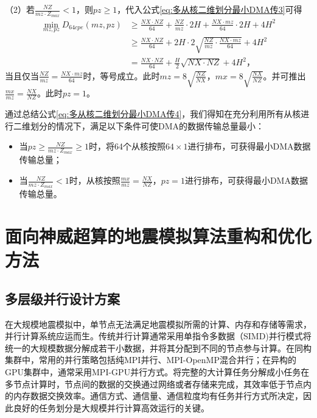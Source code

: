\documentclass[degree=doctor]{thuthesis}
\begin{document}
（2）若$\frac{NZ}{mz\cdot Z_{max}} < 1$，则$pz\ge 1$，代入公式\ref{eq:多从核二维划分最小DMA传3}可得
\begin{equation}
\begin{aligned}
  \min_{mz,pz} D_{64cpe}(mz,pz) &\ge \frac{NX\cdot NZ}{64}+\frac{NZ}{mz}\cdot 2H+\frac{NX\cdot mz}{64} \cdot 2H + 4H^2 \\
  &\ge \frac{NX\cdot NZ}{64}+2H\cdot2\sqrt{\frac{NZ}{mz}\cdot\frac{NX\cdot mz}{64} } + 4H^2 \\
  &=\frac{NX\cdot NZ}{64}+\frac{H}{2}\sqrt{NX\cdot NZ}+ 4H^2
  ，
\end{aligned}
  \label{eq:多从核二维划分最小DMA传5}
\end{equation}
当且仅当$\frac{NZ}{mz}=\frac{NX\cdot mz}{64}$时，等号成立。此时$mz=8\sqrt{\frac{NZ}{NX}}$，$mx=8\sqrt{\frac{NX}{NZ}}$。并可推出$\frac{mx}{mz}=\frac{NX}{NZ}$。此时$pz=1$。

通过总结公式\ref{eq:多从核二维划分最小DMA传4}，我们得知在充分利用所有从核进行二维划分的情况下，满足以下条件可使DMA的数据传输总量最小：
\begin{itemize}
  \item 当$pz \ge \frac{NZ}{mz\cdot Z_{max}} \ge 1$时，将64个从核按照$64\times 1$进行排布，可获得最小DMA数据传输总量；
  \item 当$\frac{NZ}{mz\cdot Z_{max}} < 1$时，从核按照$\frac{mx}{mz}=\frac{NX}{NZ}，pz=1$进行排布，可获得最小DMA数据传输总量。
\end{itemize}

\section{面向神威超算的地震模拟算法重构和优化方法}
\label{sec:contribution}

\subsection{多层级并行设计方案}
\label{sec:parallel}

在大规模地震模拟中，单节点无法满足地震模拟所需的计算、内存和存储等需求，并行计算系统应运而生。传统并行计算通常采用单指令多数据（SIMD)并行模式将统一的大规模数据分解成若干小数据，并将其分配到不同的节点参与计算。在同构集群中，常用的并行策略包括纯MPI并行、MPI-OpenMP混合并行；在异构的GPU集群中，通常采用MPI-GPU并行方式。将完整的大计算任务分解成小任务在多节点计算时，节点间的数据的交换通过网络或者存储来完成，其效率低于节点内的内存数据交换效率。通信方式、通信量、通信粒度均有任务并行方式所决定，因此良好的任务划分是大规模并行计算高效运行的关键。
\end{document}
